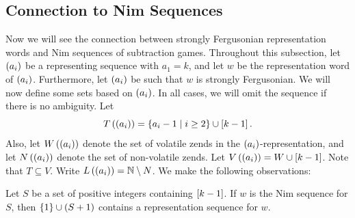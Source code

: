 \documentclass[english,12pt]{article}
\newcommand{\seq}{\p}
\begin{document}
\subsection{Connection to Nim Sequences}
Now we will see the connection between strongly Fergusonian representation words and Nim sequences of subtraction games.
Throughout this subsection, let $\seq{a_i}$ be a representing sequence with $a_1=k$, and let $w$ be the representation word of $\seq{a_i}$.  Furthermore, let $\seq{a_i}$ be such that $w$ is strongly Fergusonian.  We will now define some sets based on $\seq{a_i}$.  In all cases, we will omit the sequence if there is no ambiguity.  Let
\[
T\p{\seq{a_i}}=\st{a_i-1\mid i\geq2}\cup\bk{k-1}.
\]
Also, let $W\p{\seq{a_i}}$ denote the set of volatile zends in the $\seq{a_i}$-representation, and let $N\p{\seq{a_i}}$ denote the set of non-volatile zends.  Let $V\p{\seq{a_i}}=W\cup\bk{k-1}$.  Note that $T\subseteq V$.  Write $L\p{\seq{a_i}}=\mathbb{N}\setminus N$.
We make the following observations:
\begin{prop}\label{prop:scontt}
Let $S$ be a set of positive integers containing $\left[k-1\right]$.  If $w$ is the Nim sequence for $S$, then $\left\{1\right\}\cup\left(S+1\right)$ contains a representation sequence for $w$.
\end{prop}
\end{document}
